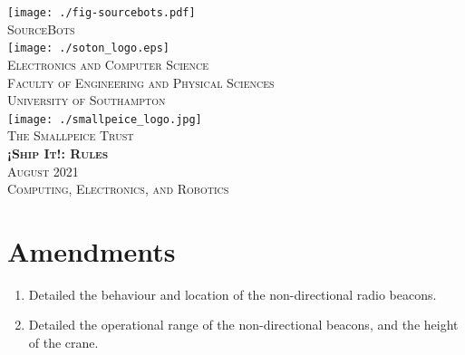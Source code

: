 \documentclass[twoside,12pt,a4paper,titlepage]{article}
\title{\gamename}
\author{\org}
\date{\timeline}
\newcommand{\gamename}{¡Ship It!\xspace}
\newcommand{\timeline}{August 2021\xspace}
\begin{document}
\begin{titlepage}
\begin{center}
\texttt{[image: ./fig-sourcebots.pdf]}~\\[1cm]
\textsc{\large SourceBots}~\\[1.8cm]
\texttt{[image: ./soton\_logo.eps]}~\\[1cm]
\textsc{\large Electronics and Computer Science}\\[0.2cm]
\textsc{\large Faculty of Engineering and Physical Sciences}\\[0.2cm]
\textsc{\large University of Southampton}\\[1.8cm]
\texttt{[image: ./smallpeice\_logo.jpg]}~\\[0.2cm]
\textsc{\large The Smallpeice Trust}\\[1.8cm]
\textsc{\huge \textbf{\gamename{}: Rules}}\\[1cm]
\textsc{\large \timeline}\\[1.2cm]
\textsc{\Large Computing, Electronics, and Robotics}
\end{center}
\end{titlepage}





\section{Amendments}
\label{sec:amendments}

\begin{enumerate}
\item Detailed the behaviour and location of the non-directional radio beacons.
\item Detailed the operational range of the non-directional beacons, and the height
      of the crane.
\end{enumerate}
\end{document}
